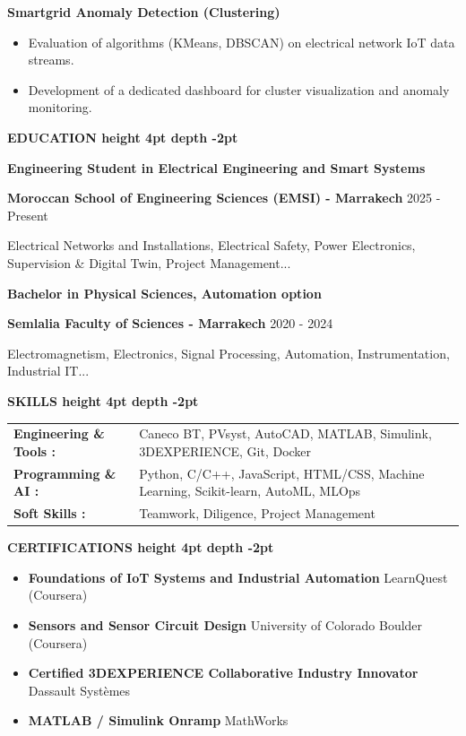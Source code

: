 \documentclass[10pt,a4paper]{altacv}
\renewcommand{\cvsection}[2][]{%
  \medskip%
  {\color{heading}\LARGE\bfseries #2 \hspace{0.2em}\leaders\vrule height 4pt depth -2pt\hfill\mbox{}}\par\smallskip
}
\renewcommand{\cvevent}[4]{%
  {\large\bfseries\color{accent}#1\par}
  \smallskip\normalsize
  \ifstrequal{#2}{}{}{%
    \textbf{\color{emphasis}#2\ifstrequal{#4}{}{}{ - #4}}%
  }%
  \hfill
  \ifstrequal{#3}{}{}{{\small#3}}%
  \par\smallskip
}
\begin{document}
{\large\bfseries\color{accent} Smartgrid Anomaly Detection (Clustering)}\\[0.05cm]
\begin{itemize}
  \item Evaluation of algorithms (KMeans, DBSCAN) on electrical network IoT data streams.
  \item Development of a dedicated dashboard for cluster visualization and anomaly monitoring.
\end{itemize}

\cvsection{EDUCATION}
\cvevent{Engineering Student in Electrical Engineering and Smart Systems}{Moroccan School of Engineering Sciences (EMSI)}{2025 - Present}{Marrakech}
\small Electrical Networks and Installations, Electrical Safety, Power Electronics, Supervision \& Digital Twin, Project Management...

\cvevent{Bachelor in Physical Sciences, Automation option}{Semlalia Faculty of Sciences}{2020 - 2024}{Marrakech}
\small Electromagnetism, Electronics, Signal Processing, Automation, Instrumentation, Industrial IT...

\cvsection{SKILLS}
\begin{tabular}{@{}ll@{}}
\textbf{Engineering \& Tools :} & Caneco BT, PVsyst, AutoCAD, MATLAB, Simulink, 3DEXPERIENCE, Git, Docker \\[2pt]
\textbf{Programming \& AI :} & Python, C/C++, JavaScript, HTML/CSS, Machine Learning, Scikit-learn, AutoML, MLOps \\[2pt]
\textbf{Soft Skills :} & Teamwork, Diligence, Project Management \\
\end{tabular}

\cvsection{CERTIFICATIONS}
\begin{itemize}[leftmargin=*, label=\textbullet, itemsep=2pt]
  \item \textbf{Foundations of IoT Systems and Industrial Automation} \hfill {\color{emphasis}LearnQuest (Coursera)}
  \item \textbf{Sensors and Sensor Circuit Design} \hfill {\color{emphasis}University of Colorado Boulder (Coursera)}
  \item \textbf{Certified 3DEXPERIENCE Collaborative Industry Innovator} \hfill {\color{emphasis}Dassault Systèmes}
  \item \textbf{MATLAB / Simulink Onramp} \hfill {\color{emphasis}MathWorks}
\end{itemize}
\end{document}
